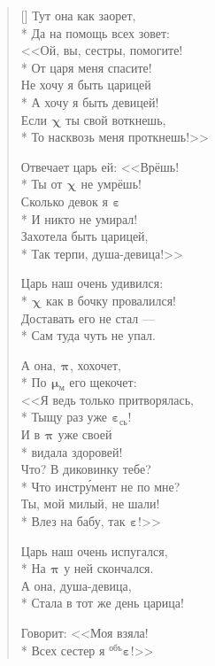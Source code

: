 \documentclass[a4paper,oneside,14pt]{scrbook}
\newcommand{\myPiz}[2]{$^{\text{#1}}${\large{$\boldsymbol{\pi}$}}$_{\text{#2}}$}
\newcommand{\myEbt}[2]{$^{\text{#1}}${\large{$\boldsymbol{\varepsilon}$}}$_{\text{#2}}$}
\newcommand{\myMnd}[2]{$^{\text{#1}}${\large{$\boldsymbol{\mu}$}}$_{\text{#2}}$}
\newcommand{\myXyi}[2]{$^{\text{#1}}${\large{$\boldsymbol{\chi}$}}$_{\text{#2}}$}
\begin{document}
\begin{verse}[\versewidth]
        Тут она как заорет,\\*
        Да на помощь всех зовет:\\
        <<Ой, вы, сестры, помогите!\\*
        От царя меня спасите!\\
        Не хочу я быть царицей\\*
        А хочу я быть девицей!\\
        Если {\myXyi{}{}} ты свой воткнешь,\\*
        То насквозь меня проткнешь!>>
        
        \vin Отвечает царь ей: <<Врёшь!\\*
        \vin Ты от {\myXyi{}{}} не умрёшь!\\
        \vin Сколько девок я {\myEbt{}{}}\\*
        \vin И никто не умирал!\\
        \vin Захотела быть царицей,\\*
        \vin Так терпи, душа-девица!>>
        
        Царь наш очень удивился:\\*
        {\myXyi{}{}} как в бочку провалился!\\
        Доставать его не стал ---\\*
        Сам туда чуть не упал.
        
        \vin А она, {\myPiz{}{}}, хохочет,\\*
        \vin По {\myMnd{}{м}} его щекочет:\\
        \vin <<Я ведь только притворялась,\\*
        \vin Тыщу раз уже {\myEbt{}{сь}}!\\
        \vin И в {\myPiz{}{}} уже своей\\*
        \vin {\myXyi{}{}} видала здоровей!\\
        \vin Что? В диковинку тебе?\\*
        \vin Что инстр\'{у}мент не по мне?\\
        \vin Ты, мой милый, не шали!\\*
        \vin Влез на бабу, так {\myEbt{}{}}!>>
        
        Царь наш очень испугался,\\*
        На {\myPiz{}{}} у ней скончался.\\
        А она, душа-девица,\\*
        Стала в тот же день царица!
        
        \vin Говорит: <<Моя взяла!\\*
        \vin Всех сестер я {\myEbt{объ}{}}!>>
    \end{verse}
    
\end{document}
